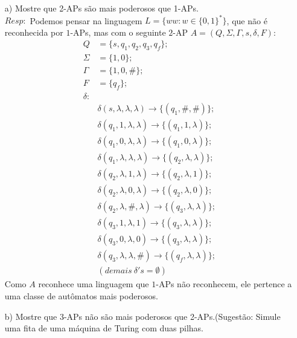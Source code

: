 \documentclass{homework}
\begin{document}
\pagebreak

	\begin{enumerate}
		\item[a)] Mostre que 2-APs são mais poderosos que 1-APs.\\
		$Resp:$ Podemos pensar na linguagem $L = \{ww: w \in \{0,1\}^*\}$, que não é reconhecida por $1$-APs, mas com o seguinte $2$-AP $A = (Q,\Sigma,\Gamma,s,\delta,F)$:\\
		\begin{align*}
			Q & = \{s,q_1,q_2,q_3,q_f\};\\
			\Sigma & = \{1,0\};\\
			\Gamma & = \{1,0,\#\};\\
			F & = \{q_f\};\\
			\delta : \\
			&\delta(s, \lambda, \lambda, \lambda) \rightarrow \{(q_1,\#,\#)\};\\
			&\delta(q_1, 1, \lambda, \lambda) \rightarrow \{(q_1,1,\lambda)\};\\
			&\delta(q_1, 0, \lambda, \lambda) \rightarrow \{(q_1,0,\lambda)\};\\
			&\delta(q_1, \lambda, \lambda, \lambda) \rightarrow \{(q_2,\lambda,\lambda)\};\\
			&\delta(q_2, \lambda, 1, \lambda) \rightarrow \{(q_2,\lambda,1)\};\\
			&\delta(q_2, \lambda, 0, \lambda) \rightarrow \{(q_2,\lambda,0)\};\\
			&\delta(q_2, \lambda, \#,\lambda) \rightarrow \{(q_3,\lambda,\lambda)\};\\
			&\delta(q_3, 1, \lambda, 1) \rightarrow \{(q_3,\lambda,\lambda)\};\\
			&\delta(q_3, 0, \lambda, 0) \rightarrow \{(q_3,\lambda,\lambda)\};\\
			&\delta(q_3, \lambda, \lambda, \#) \rightarrow \{(q_f,\lambda,\lambda)\};\\
			&(demais\ \delta 's = \emptyset)
		\end{align*}
		Como $A$ reconhece uma linguagem que $1$-APs não reconhecem, ele pertence a uma classe de autômatos mais poderosos.				
		\item[b)] Mostre que 3-APs não são mais poderosos que 2-APs.(Sugestão: Simule uma fita de uma máquina de Turing com duas pilhas.
	\end{enumerate}
\end{document}
